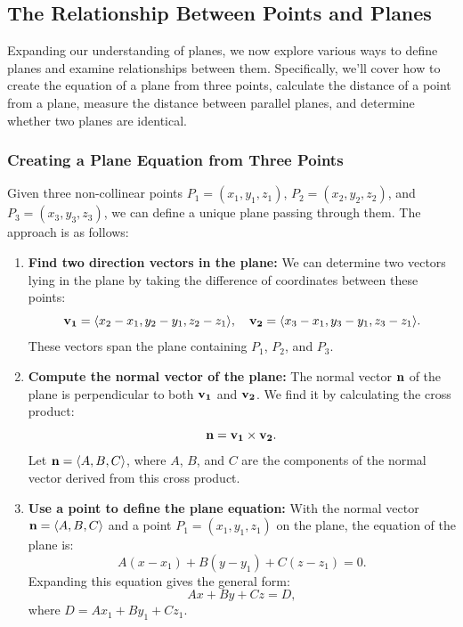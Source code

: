 \subsection*{The Relationship Between Points and Planes}


\noindent Expanding our understanding of planes, we now explore various ways to define planes and examine relationships between them. Specifically, we’ll cover how to create the equation of a plane from three points, calculate the distance of a point from a plane, measure the distance between parallel planes, and determine whether two planes are identical.

\subsubsection*{Creating a Plane Equation from Three Points}

\noindent Given three non-collinear points \( P_1 = (x_1, y_1, z_1) \), \( P_2 = (x_2, y_2, z_2) \), and \( P_3 = (x_3, y_3, z_3) \), we can define a unique plane passing through them. The approach is as follows:

\begin{enumerate}
    \item \textbf{Find two direction vectors in the plane:} We can determine two vectors lying in the plane by taking the difference of coordinates between these points:
    \[
    \vb{v_1} = \langle x_2 - x_1, y_2 - y_1, z_2 - z_1 \rangle, \quad \vb{v_2} = \langle x_3 - x_1, y_3 - y_1, z_3 - z_1 \rangle.
    \]
    These vectors span the plane containing \( P_1 \), \( P_2 \), and \( P_3 \).

    \item \textbf{Compute the normal vector of the plane:} The normal vector \( \vb{n} \) of the plane is perpendicular to both \( \vb{v_1} \) and \( \vb{v_2} \). We find it by calculating the cross product:
    \[
    \vb{n} = \vb{v_1} \times \vb{v_2}.
    \]
    Let \( \vb{n} = \langle A, B, C \rangle \), where \( A \), \( B \), and \( C \) are the components of the normal vector derived from this cross product.

    \item \textbf{Use a point to define the plane equation:} With the normal vector \( \vb{n} = \langle A, B, C \rangle \) and a point \( P_1 = (x_1, y_1, z_1) \) on the plane, the equation of the plane is:
    \[
    A(x - x_1) + B(y - y_1) + C(z - z_1) = 0.
    \]
    Expanding this equation gives the general form:
    \[
    Ax + By + Cz = D,
    \]
    where \( D = Ax_1 + By_1 + Cz_1 \).
\end{enumerate}

